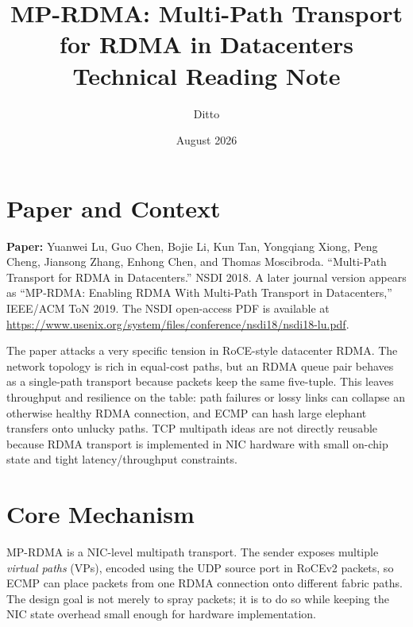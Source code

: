 \documentclass[10.5pt]{article}
\title{MP-RDMA: Multi-Path Transport for RDMA in Datacenters\\\large Technical Reading Note}
\author{Ditto}
\date{August 2026}
\begin{document}
\maketitle

\section{Paper and Context}
\textbf{Paper:} Yuanwei Lu, Guo Chen, Bojie Li, Kun Tan, Yongqiang Xiong, Peng Cheng, Jiansong Zhang, Enhong Chen, and Thomas Moscibroda. ``Multi-Path Transport for RDMA in Datacenters.'' NSDI 2018. A later journal version appears as ``MP-RDMA: Enabling RDMA With Multi-Path Transport in Datacenters,'' IEEE/ACM ToN 2019. The NSDI open-access PDF is available at \url{https://www.usenix.org/system/files/conference/nsdi18/nsdi18-lu.pdf}.

The paper attacks a very specific tension in RoCE-style datacenter RDMA. The network topology is rich in equal-cost paths, but an RDMA queue pair behaves as a single-path transport because packets keep the same five-tuple. This leaves throughput and resilience on the table: path failures or lossy links can collapse an otherwise healthy RDMA connection, and ECMP can hash large elephant transfers onto unlucky paths. TCP multipath ideas are not directly reusable because RDMA transport is implemented in NIC hardware with small on-chip state and tight latency/throughput constraints.

\section{Core Mechanism}
MP-RDMA is a NIC-level multipath transport. The sender exposes multiple \emph{virtual paths} (VPs), encoded using the UDP source port in RoCEv2 packets, so ECMP can place packets from one RDMA connection onto different fabric paths. The design goal is not merely to spray packets; it is to do so while keeping the NIC state overhead small enough for hardware implementation.
\end{document}
